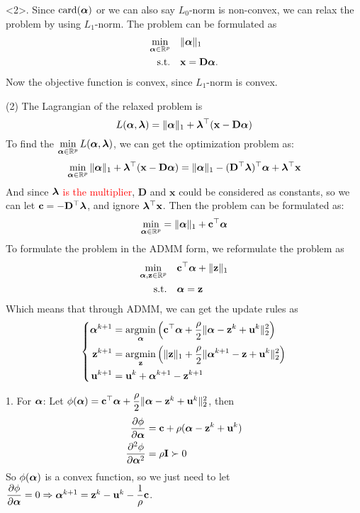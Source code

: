 <2>. Since $\text{card}(\boldsymbol{\alpha})$ or we can also say $L_0$-norm is non-convex, we can relax the problem by using $L_1$-norm. The problem can be formulated as
\begin{align*}
\min_{\boldsymbol{\alpha}\in\mathbb{R}^p} & \quad \|\boldsymbol{\alpha}\|_1 \\
\text{s.t.} & \quad \mathbf{x} = \mathbf{D}\boldsymbol{\alpha}.
\end{align*}
Now the objective function is convex, since $L_1$-norm is convex.

(2) The Lagrangian of the relaxed problem is
$$L(\boldsymbol{\alpha}, \boldsymbol{\lambda}) = \|\boldsymbol{\alpha}\|_1 + \boldsymbol{\lambda}^{\top}(\mathbf{x} - \mathbf{D}\boldsymbol{\alpha})$$
To find the $\min\limits_{\boldsymbol{\alpha}\in\mathbb{R}^p}L(\boldsymbol{\alpha}, \boldsymbol{\lambda})$, we can get the optimization problem as:
$$\min_{\boldsymbol{\alpha}\in\mathbb{R}^p} \|\boldsymbol{\alpha}\|_1 + \boldsymbol{\lambda}^{\top}(\mathbf{x} - \mathbf{D}\boldsymbol{\alpha}) = \|\boldsymbol{\alpha}\|_1 - (\mathbf{D}^{\top}\boldsymbol{\lambda})^{\top}\boldsymbol{\alpha} + \boldsymbol{\lambda}^{\top}\mathbf{x}$$
And since $\boldsymbol{\lambda}$ \textcolor{red}{is the multiplier}, $\mathbf{D}$ and $\mathbf{x}$ could be considered as constants, so we can let $\mathbf{c} = -\mathbf{D}^{\top}\boldsymbol{\lambda}$, and ignore $\boldsymbol{\lambda}^{\top}\mathbf{x}$. Then the problem can be formulated as:
$$\min_{\boldsymbol{\alpha}\in\mathbb{R}^p} = \|\boldsymbol{\alpha}\|_1 + \mathbf{c}^{\top}\boldsymbol{\alpha}$$
To formulate the problem in the ADMM form, we reformulate the problem as
\begin{align*}
\min_{\boldsymbol{\alpha},\mathbf{z}\in\mathbb{R}^p} & \quad \mathbf{c}^{\top}\boldsymbol{\alpha} + \|\mathbf{z}\|_1 \\
\text{s.t.} & \quad \boldsymbol{\alpha} = \mathbf{z}
\end{align*}
Which means that through ADMM, we can get the update rules as
$$\left\{
\begin{aligned}
\boldsymbol{\alpha}^{k+1} & = \mathop{\rm argmin}_{\boldsymbol{\alpha}} \left(\mathbf{c}^{\top}\boldsymbol{\alpha} + \dfrac{\rho}{2}\|\boldsymbol{\alpha} - \mathbf{z}^k + \mathbf{u}^k\|_2^2\right) \\
\mathbf{z}^{k+1} & = \mathop{\rm argmin}_{\mathbf{z}} \left(\|\mathbf{z}\|_1 + \dfrac{\rho}{2}\|\boldsymbol{\alpha}^{k+1} - \mathbf{z} + \mathbf{u}^k\|_2^2\right) \\
\mathbf{u}^{k+1} & = \mathbf{u}^k + \boldsymbol{\alpha}^{k+1} - \mathbf{z}^{k+1}
\end{aligned}
\right.$$

1. For $\boldsymbol{\alpha}$: Let $\phi(\boldsymbol{\alpha}) = \mathbf{c}^{\top}\boldsymbol{\alpha} + \dfrac{\rho}{2}\|\boldsymbol{\alpha} - \mathbf{z}^k + \mathbf{u}^k\|_2^2$, then
\begin{align*}
\dfrac{\partial \phi}{\partial \boldsymbol{\alpha}} & = \mathbf{c} + \rho(\boldsymbol{\alpha} - \mathbf{z}^k + \mathbf{u}^k)\\
\dfrac{\partial^2 \phi}{\partial \boldsymbol{\alpha}^2} & = \rho \mathbf{I} \succ 0
\end{align*}
So $\phi(\boldsymbol{\alpha})$ is a convex function, so we just need to let $\dfrac{\partial \phi}{\partial \boldsymbol{\alpha}} = 0\Rightarrow \boldsymbol{\alpha}^{k+1} = \mathbf{z}^k - \mathbf{u}^k - \dfrac{1}{\rho}\mathbf{c}$.


